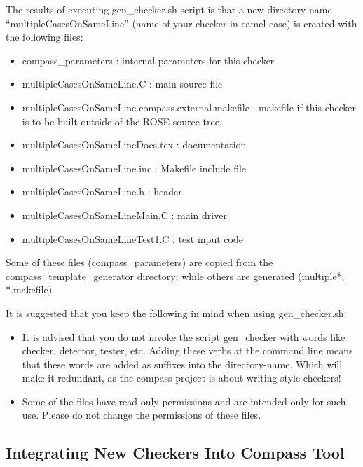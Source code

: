 The results of executing gen\_checker.sh script is that a new directory name 
``multipleCasesOnSameLine''
(name of your checker in camel case) is created with the following files:
\begin{itemize}
\item compass\_parameters : internal parameters for this checker 
\item multipleCasesOnSameLine.C : main source file 
\item multipleCasesOnSameLine.compass.external.makefile : makefile if this
checker is to be built outside of the ROSE source tree.
\item multipleCasesOnSameLineDocs.tex : documentation 
\item multipleCasesOnSameLine.inc : Makefile include file
\item multipleCasesOnSameLine.h : header
\item multipleCasesOnSameLineMain.C : main driver
\item multipleCasesOnSameLineTest1.C : test input code
\end{itemize}

Some of these files (compass\_parameters)
are copied from the compass\_template\_generator directory; while others are
generated (multiple*, *.makefile)

It is suggested that you keep the following in mind when using gen\_checker.sh:
\begin{itemize}
\item
   It is advised that you do not invoke the script gen\_checker with words
   like checker, detector, tester, etc. Adding these verbs at the command
   line means that these words are added as suffixes into the
   directory-name. Which will make it redundant, as the compass project is
   about writing style-checkers!
\item
   Some of the files have read-only permissions and are intended only for
   such use. Please do not change the permissions of these files.

\end{itemize}

\subsection{Integrating New Checkers Into Compass Tool}
\label{howToIntegrateNewCheckers}

